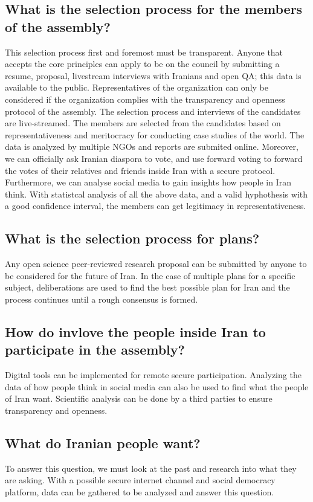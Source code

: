 \documentclass{IEEEtran}
\begin{document}
\subsection{What is the selection process for the members of the assembly?}
This selection process first and foremost must be transparent. Anyone that accepts the core principles can apply to be on the council by submitting a
 resume, proposal, livestream interviews with Iranians and open QA; this data is available to the public. Representatives of the organization can only be considered if the organization complies with the transparency and openness protocol of the assembly. 
 The selection process and interviews of the candidates are live-streamed. The members are selected from the candidates based on representativeness and meritocracy for conducting case studies of the world. 
 The data is analyzed by multiple NGOs and reports are submited online. 
 Moreover, we can officially ask Iranian diaspora to vote, and use forward voting to forward the votes of their relatives and friends inside Iran with a secure protocol.
 Furthermore, we can analyse social media to gain insights how people in Iran think.
 With statistcal analysis of all the above data, and a valid hyphothesis with a good confidence interval, the members can get legitimacy in representativeness.

 
\subsection{What is the selection process for plans?}
Any open science peer-reviewed research proposal can be submitted by anyone to be considered for the future of Iran. In the case of multiple plans for a specific subject, deliberations are used to find the best possible plan for Iran and the process continues until a rough consensus is formed.

\subsection{How do invlove the people inside Iran to participate in the assembly?}
Digital tools can be implemented for remote secure participation. Analyzing the data of how people think in social media can also be used to find what the people of Iran want. Scientific analysis can be done by a third parties to ensure transparency and openness.



\subsection{What do Iranian people want?}
To answer this question, we must look at the past and research into what they are asking. With a possible secure internet channel and social democracy platform, data can be gathered to be analyzed and answer this question.
\end{document}
